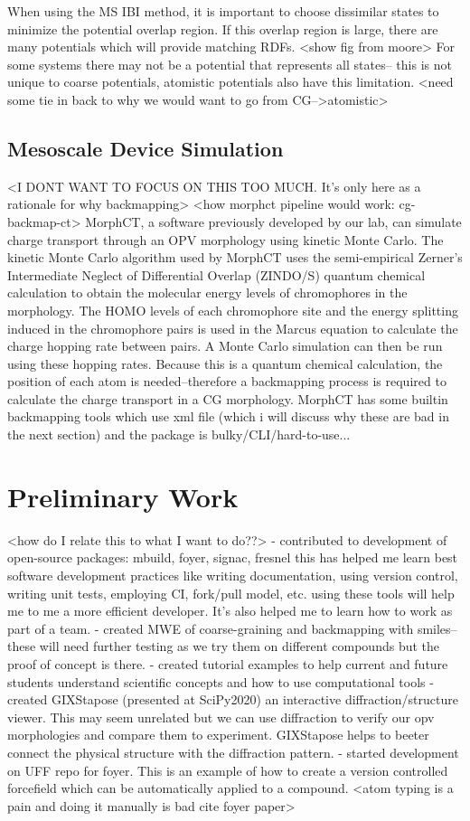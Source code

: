 When using the MS IBI method, it is important to choose dissimilar states to minimize the potential overlap region.
If this overlap region is large, there are many potentials which will provide matching RDFs. <show fig from moore>
For some systems there may not be a potential that represents all states-- this is not unique to coarse potentials, atomistic potentials also have this limitation.
<need some tie in back to why we would want to go from CG-->atomistic>

\subsection*{Mesoscale Device Simulation}
<I DONT WANT TO FOCUS ON THIS TOO MUCH. It's only here as a rationale for why backmapping>
<how morphct pipeline would work: cg-backmap-ct>
MorphCT, a software previously developed by our lab, can simulate charge transport through an OPV morphology using kinetic Monte Carlo\cite{Miller2018a,MorphCT,morphct2.2}.
The kinetic Monte Carlo algorithm used by MorphCT uses the semi-empirical Zerner's Intermediate Neglect of Differential Overlap (ZINDO/S) quantum chemical calculation to obtain the molecular energy levels of chromophores in the morphology.
The HOMO levels of each chromophore site and the energy splitting induced in the chromophore pairs is used in the Marcus equation to calculate the charge hopping rate between pairs.
A Monte Carlo simulation can then be run using these hopping rates.
Because this is a quantum chemical calculation, the position of each atom is needed--therefore a backmapping process is required to calculate the charge transport in a CG morphology.
MorphCT has some builtin backmapping tools which use xml file (which i will discuss why these are bad in the next section) and the package is bulky/CLI/hard-to-use...

\section*{Preliminary Work}
<how do I relate this to what I want to do??>
- contributed to development of open-source packages: mbuild, foyer, signac, fresnel
 this has helped me learn best software development practices like writing documentation, using version control, writing unit tests, employing CI, fork/pull model, etc.
using these tools will help me to me a more efficient developer.
It's also helped me to learn how to work as part of a team.
 - created MWE of coarse-graining and backmapping with smiles-- these will need further testing as we try them on different compounds but the proof of concept is there.
 - created tutorial examples to help current and future students understand scientific concepts and how to use computational tools
 - created GIXStapose (presented at SciPy2020) an interactive diffraction/structure viewer.
This may seem unrelated but we can use diffraction to verify our opv morphologies and compare them to experiment.
GIXStapose helps to beeter connect the physical structure with the diffraction pattern.
- started development on UFF repo for foyer.
This is an example of how to create a version controlled forcefield which can be automatically applied to a compound.
<atom typing is a pain and doing it manually is bad cite foyer paper>

